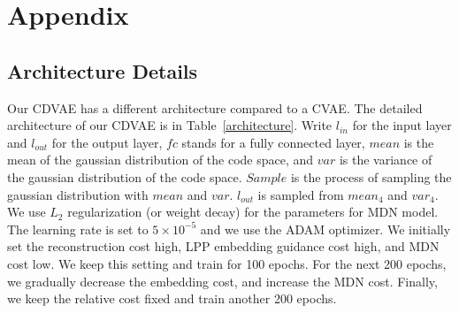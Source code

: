 \documentclass[10pt,twocolumn,letterpaper]{article}
\begin{document}

\clearpage

\section{Appendix}
\subsection{Architecture Details}
Our CDVAE has a different architecture compared to a CVAE. The detailed architecture of our CDVAE is in 
Table~\ref{architecture}. Write $l_{in}$ for the input layer and $l_{out}$ for the output layer, 
$fc$ stands for a fully connected layer, $mean$ is the mean of the gaussian distribution of the code 
space, and $var$ is the variance of the gaussian distribution of the code space. $Sample$ is 
the process of sampling the gaussian distribution with $mean$ and $var$. $l_{out}$ is sampled from 
$mean_4$ and $var_4$. We use $L_2$ regularization (or weight decay) for the parameters for MDN model. 
The learning rate is set to  $5 \times 10^{-5}$ and we use the ADAM optimizer. We initially set the 
reconstruction cost high, LPP embedding guidance cost high, and MDN cost low. We keep this setting 
and train for 100 epochs. For the next 200 epochs, we gradually decrease the embedding cost, and 
increase the MDN cost. Finally, we keep the relative cost fixed and train another 200 epochs. 
\end{document}
